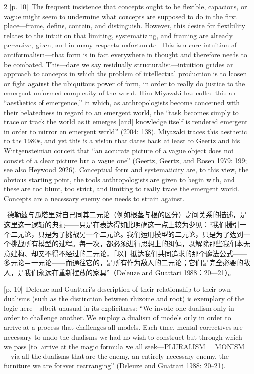 \documentclass[10pt,a4paper]{article}
\begin{document}
\begin{paracol}{2}
{\scriptsize\color{gray} [p. 10]}\ The frequent insistence that concepts ought to be flexible, capacious, or vague might seem to undermine what concepts are supposed to do in the first place—frame, define, contain, and distinguish. However, this desire for flexibility relates to the intuition that limiting, systematizing, and framing are already pervasive, given, and in many respects unfortunate. This is a core intuition of antiformalism—that form is in fact everywhere in thought and therefore needs to be combated. This—dare we say residually structuralist—intuition guides an approach to concepts in which the problem of intellectual production is to loosen or fight against the ubiquitous power of form, in order to really do justice to the emergent unformed complexity of the world. Hiro Miyazaki has called this an “aesthetics of emergence,” in which, as anthropologists become concerned with their belatedness in regard to an emergent world, the “task becomes simply to trace or track the world as it emerges [and] knowledge itself is rendered emergent in order to mirror an emergent world” (2004: 138). Miyazaki traces this aesthetic to the 1980s, and yet this is a vision that dates back at least to Geertz and his Wittgensteinian conceit that “an accurate picture of a vague object does not consist of a clear picture but a vague one” (Geertz, Geertz, and Rosen 1979: 199; see also Heywood 2026). Conceptual form and systematicity are, to this view, the obvious starting point, the tools anthropologists are given to begin with, and these are too blunt, too strict, and limiting to really trace the emergent world. Concepts are a necessary enemy one needs to strain against.\par
\switchcolumn*
{\scriptsize\color{gray} [p. 10]}\ 德勒兹与瓜塔里对自己同其二元论（例如根茎与根的区分）之间关系的描述，是这里这一逻辑的典范——只是在表达得如此明确这一点上较为少见：“我们援引一个二元论，只是为了挑战另一个二元论。我们运用模型的二元论，只是为了达到一个挑战所有模型的过程。每一次，都必须进行思想上的纠偏，以解除那些我们本无意建构、却又不得不经过的二元论，［以］抵达我们共同追求的那个魔法公式——多元论＝一元论——而通往它的，是所有作为敌人的二元论；它们是完全必要的敌人，是我们永远在重新摆放的家具”（Deleuze and Guattari 1988：20—21）。\par
\switchcolumn
{\scriptsize\color{gray} [p. 10]}\ Deleuze and Guattari’s description of their relationship to their own dualisms (such as the distinction between rhizome and root) is exemplary of the logic here—albeit unusual in its explicitness: “We invoke one dualism only in order to challenge another. We employ a dualism of models only in order to arrive at a process that challenges all models. Each time, mental correctives are necessary to undo the dualisms we had no wish to construct but through which we pass [to] arrive at the magic formula we all seek—PLURALISM = MONISM—via all the dualisms that are the enemy, an entirely necessary enemy, the furniture we are forever rearranging” (Deleuze and Guattari 1988: 20–21).\par

\end{paracol}
\end{document}
